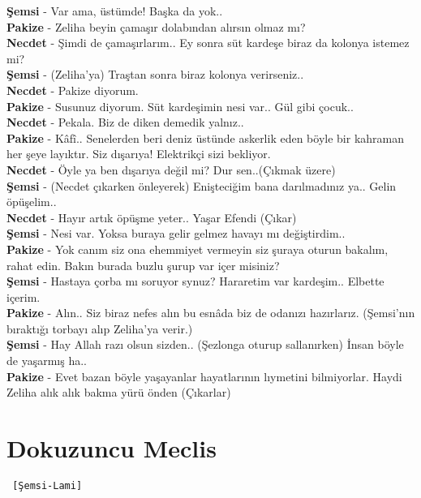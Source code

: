 \documentclass[]{book}
\begin{document}
\textbf{Şemsi} - Var ama, üstümde! Başka da yok..\\
\textbf{Pakize} - Zeliha beyin çamaşır dolabından alırsın olmaz mı?\\
\textbf{Necdet} - Şimdi de çamaşırlarım.. Ey sonra süt kardeşe biraz da kolonya istemez mi?\\
\textbf{Şemsi} - (Zeliha'ya) Traştan sonra biraz kolonya verirseniz..\\
\textbf{Necdet} - Pakize diyorum.\\
\textbf{Pakize} - Susunuz diyorum. Süt kardeşimin nesi var.. Gül gibi çocuk..\\
\textbf{Necdet} - Pekala. Biz de diken demedik yalnız..\\
\textbf{Pakize} - Kâfî.. Senelerden beri deniz üstünde askerlik eden böyle bir kahraman her şeye layıktır. Siz dışarıya! Elektrikçi sizi bekliyor.\\
\textbf{Necdet} - Öyle ya ben dışarıya değil mi? Dur sen..(Çıkmak üzere)\\
\textbf{Şemsi} - (Necdet çıkarken önleyerek) Enişteciğim bana darılmadınız ya.. Gelin öpüşelim..\\
\textbf{Necdet} - Hayır artık öpüşme yeter.. Yaşar Efendi (Çıkar)\\
\textbf{Şemsi} - Nesi var. Yoksa buraya gelir gelmez havayı mı değiştirdim..\\
\textbf{Pakize} - Yok canım siz ona ehemmiyet vermeyin siz şuraya oturun bakalım, rahat edin. Bakın burada buzlu şurup var içer misiniz?\\
\textbf{Şemsi} - Hastaya çorba mı soruyor synuz? Hararetim var kardeşim.. Elbette içerim.\\
\textbf{Pakize} - Alın.. Siz biraz nefes alın bu esnâda biz de odanızı hazırlarız. (Şemsi'nın bıraktığı torbayı alıp Zeliha'ya verir.)\\
\textbf{Şemsi} - Hay Allah razı olsun sizden.. (Şezlonga oturup sallanırken) İnsan böyle de yaşarmış ha..\\
\textbf{Pakize} - Evet bazan böyle yaşayanlar hayatlarının lıymetini bilmiyorlar. Haydi Zeliha alık alık bakma yürü önden (Çıkarlar)\\

\hypertarget{dokuzuncu-meclis}{%
\section{Dokuzuncu Meclis}\label{dokuzuncu-meclis}}

\begin{verbatim}
 [Şemsi-Lami]
\end{verbatim}
\end{document}
